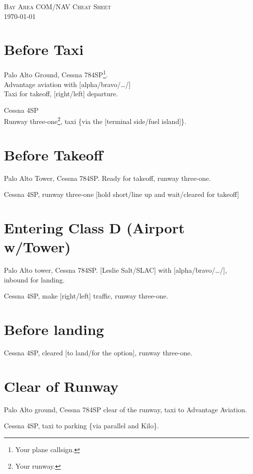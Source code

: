 \documentclass[article,9pt,landscape]{memoir}
\begin{document}



\begin{multicols*}{4}
  \textsc{Bay Area COM/NAV Cheat Sheet\\\today\\[0.5em]}

  \chapter{Before Taxi}
  Palo Alto Ground, Cessna 784SP\footnote{Your plane callsign.}.\\
  Advantage aviation with [alpha/bravo/\dots/]\\
  Taxi for takeoff, [right/left] departure.

  \readback
  Cessna 4SP\\
  Runway three-one\footnote{Your runway.}, taxi
  \{via the [terminal side/fuel island]\}.

  \chapter{Before Takeoff}
  Palo Alto Tower, Cessna 784SP.
  Ready for takeoff, runway three-one.

  \readback 
  Cessna 4SP, runway three-one [hold short/line up and
    wait/cleared for takeoff]

  \chapter{Entering Class D (Airport w/Tower)}
  Palo Alto tower, Cessna 784SP.
  [Leslie Salt/SLAC] with [alpha/bravo/\dots/],
  inbound for landing.

  \readback
  Cessna 4SP, make [right/left] traffic, runway three-one.

  \chapter{Before landing}
  
  \readback
  Cessna 4SP, cleared [to land/for the option], runway three-one.

  \chapter{Clear of Runway}
  Palo Alto ground, Cessna 784SP clear of the runway, taxi to
  Advantage Aviation.

  \readback
  Cessna 4SP, taxi to parking \{via parallel and Kilo\}.


\end{multicols*}
\end{document}
